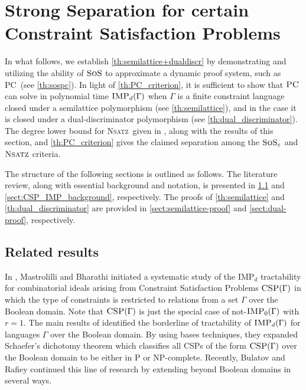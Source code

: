 \documentclass[11pt]{article}
\newcommand{\sos}{\text{\sc{SoS}}}
\newcommand{\CSP}{\textsc{CSP}}
\newcommand{\IMP}{\textsc{IMP}}
\newcommand{\PC}{\textsc{PC}}
\newcommand{\Nsatz}{\textsc{Nsatz}}
\newcommand{\1}{\textbf{1}}
\newcommand{\GB}{\text{Gr\"{o}bner} }
\begin{document}
\section{Strong Separation for certain Constraint Satisfaction Problems}\label{sect:applications}
 In what follows, we establish \cref{th:semilattice+dualdiscr} by demonstrating and utilizing the ability of \(\sos\) to approximate a dynamic proof system, such as \PC\ (see \cref{th:sospc}).
 In light of \cref{th:PC_criterion}, it is sufficient to show that $\PC$ can solve in polynomial time $\IMP_d(\Gamma)$ when $\Gamma$ is a finite constraint language closed under a semilattice polymorphism (see \cref{th:semilattice}), and in the case it is closed under a dual-discriminator polymorphism (see \cref{th:dual_discriminator}). 
%
 The degree lower bound for \Nsatz\ given in \cite{BussP98}, along with the results of this section, and \cref{th:PC_criterion} gives the claimed separation among the $\sos_{\varepsilon}$ and $\Nsatz$ criteria. 

The structure of the following sections is outlined as follows. The literature review, along with essential background and notation, is presented in \cref{sect:csp_literature} and \cref{sect:CSP_IMP_background}, respectively. The proofs of \cref{th:semilattice} and \cref{th:dual_discriminator} are provided in \cref{sect:semilattice-proof} and \cref{sect:dual-proof}, respectively.
\subsection{Related results} \label{sect:csp_literature}
In \cite{Mastrolilli21TALG, BharathiM21}, Mastrolilli and Bharathi initiated a systematic study of the IMP$_d$ tractability for combinatorial ideals arising from Constraint Satisfaction Problems $\CSP(\Gamma)$ in which the type of constraints is restricted to relations from a set $\Gamma$ over the Boolean domain.
Note that $\CSP(\Gamma)$ is just the special case of not-$\IMP_0(\Gamma)$ with $r=1$.
The main results of \cite{Mastrolilli21TALG, BharathiM21} identified the borderline of tractability of $\IMP_d(\Gamma)$ for languages $\Gamma$ over the Boolean domain. By using \GB bases techniques, they expanded Schaefer's dichotomy theorem \cite{Schaefer78} which classifies all CSPs of the form $\CSP(\Gamma)$ over the Boolean domain to be either in P or NP-complete. Recently, Bulatov and Rafiey \cite{BulatovRSTOC22, BulatovRSTACS22} continued this line of research by extending \cite{Mastrolilli21TALG, BharathiM21} beyond Boolean domains in several ways. %
\end{document}
